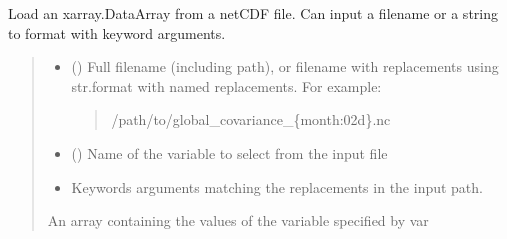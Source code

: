 \documentclass[letterpaper,10pt,english]{sphinxmanual}
\begin{document}
\begin{fulllineitems}
\label{\detokenize{misc:glomar_gridding.io.load_array}}
\pysigstartsignatures
\pysiglinewithargsret
{}
{\sphinxparamcomma {}\sphinxparamcomma {}}
{}
\pysigstopsignatures
\sphinxAtStartPar
Load an xarray.DataArray from a netCDF file. Can input a filename or a
string to format with keyword arguments.
\begin{quote}\begin{description}
\begin{itemize}
\item {}
\sphinxAtStartPar
{} () \textendash{}
\sphinxAtStartPar
Full filename (including path), or filename with replacements using
str.format with named replacements. For example:
\begin{quote}

\sphinxAtStartPar
/path/to/global\_covariance\_\{month:02d\}.nc
\end{quote}


\item {}
\sphinxAtStartPar
{} () \textendash{} Name of the variable to select from the input file

\item {}
\sphinxAtStartPar
{} \textendash{} Keywords arguments matching the replacements in the input path.

\end{itemize}

\sphinxAtStartPar
{} \textendash{} An array containing the values of the variable specified by var

\sphinxAtStartPar
{}

\end{description}\end{quote}

\end{fulllineitems}
\end{document}
